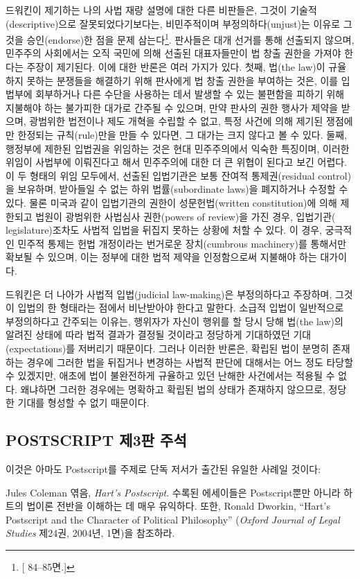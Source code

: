 드워킨이 제기하는 나의 사법 재량 설명에 대한 다른 비판들은, 그것이
기술적(descriptive)으로 잘못되었다기보다는, 비민주적이며
부정의하다(unjust)는 이유로 그것을 승인(endorse)한 점을 문제
삼는다\footnote{{[} 84--85면.{]}}. 판사들은 대개 선거를 통해
선출되지 않으며, 민주주의 사회에서는 오직 국민에 의해 선출된
대표자들만이 법 창출 권한을 가져야 한다는 주장이 제기된다. 이에 대한
반론은 여러 가지가 있다. 첫째, 법(the law)이 규율하지 못하는 분쟁들을
해결하기 위해 판사에게 법 창출 권한을 부여하는 것은, 이를 입법부에
회부하거나 다른 수단을 사용하는 데서 발생할 수 있는 불편함을 피하기 위해
지불해야 하는 불가피한 대가로 간주될 수 있으며, 만약 판사의 권한 행사가
제약을 받으며, 광범위한 법전이나 제도 개혁을 수립할 수 없고, 특정 사건에
의해 제기된 쟁점에만 한정되는 규칙(rule)만을 만들 수 있다면, 그 대가는
크지 않다고 볼 수 있다. 둘째, 행정부에 제한된 입법권을 위임하는 것은
현대 민주주의에서 익숙한 특징이며, 이러한 위임이 사법부에 이뤄진다고
해서 민주주의에 대한 더 큰 위협이 된다고 보긴 어렵다. 이 두 형태의 위임
모두에서, 선출된 입법기관은 보통 잔여적 통제권(residual control)을
보유하며, 받아들일 수 없는 하위 법률(subordinate laws)을 폐지하거나
수정할 수 있다. 물론 미국과 같이 입법기관의 권한이 성문헌법(written
constitution)에 의해 제한되고 법원이 광범위한 사법심사 권한(powers of
review)을 가진 경우, 
입법기관( legislature)조차도 사법적 입법을
뒤집지 못하는 상황에 처할 수 있다. 이 경우, 궁극적인 민주적 통제는 헌법
개정이라는 번거로운 장치(cumbrous machinery)를 통해서만 확보될 수
있으며, 이는 정부에 대한 법적 제약을 인정함으로써 지불해야 하는
대가이다.

드워킨은 더 나아가 사법적 입법(judicial law-making)은 부정의하다고
주장하며, 그것이  입법의 한 형태라는 점에서
비난받아야 한다고 말한다. 소급적 입법이 일반적으로 부정의하다고 간주되는
이유는, 행위자가 자신이 행위를 할 당시 당해 법(the law)의 알려진 상태에
따라 법적 결과가 결정될 것이라고 정당하게 기대하였던
기대(expectations)를 저버리기 때문이다. 그러나 이러한 반론은, 확립된
법이 분명히 존재하는 경우에 그러한 법을 뒤집거나 변경하는 사법적 판단에
대해서는 어느 정도 타당할 수 있겠지만, 애초에 법이 불완전하게 규율하고
있던 난해한 사건에서는 적용될 수 없다. 왜냐하면 그러한 경우에는 명확하고
확립된 법의 상태가 존재하지 않으므로, 정당한 기대를 형성할 수 없기
때문이다.

\newpage

{\footnotesize

\subsection{POSTSCRIPT 제3판
주석}\label{postscript-uxc81c3uxd310-uxc8fcuxc11d}

이것은 아마도 Postscript를 주제로 단독 저서가 출간된 유일한 사례일
것이다:

Jules Coleman 엮음, \emph{Hart's Postscript}. 수록된 에세이들은
Postscript뿐만 아니라 하트의 법이론 전반을 이해하는 데 매우 유익하다.
또한, Ronald Dworkin, ``Hart's Postscript and the Character of Political
Philosophy'' (\emph{Oxford Journal of Legal Studies} 제24권, 2004년,
1면)을 참조하라.

}